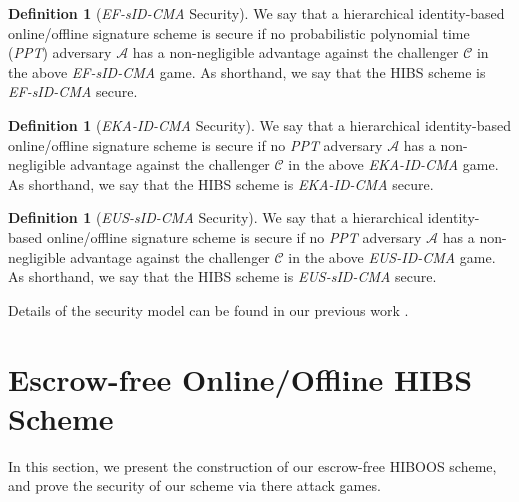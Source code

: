 \documentclass[times]{secauth}
\theoremstyle{definition}
\newtheorem{definition}[theorem]{Definition}
\theoremstyle{remark}
\begin{document}
\begin{definition}[\emph{EF-sID-CMA} Security]
We say that a hierarchical identity-based online/offline signature scheme is secure if no probabilistic polynomial time (\emph{PPT}) adversary $\mathcal{A}$ has a non-negligible advantage against the challenger $\mathcal{C}$ in the above \emph{EF-sID-CMA} game. 
As shorthand, we say that the HIBS scheme is \emph{EF-sID-CMA} secure.
\end{definition}
\par
\begin{definition}[\emph{EKA-ID-CMA} Security]
We say that a hierarchical identity-based online/offline signature scheme is secure if no \emph{PPT} adversary $\mathcal{A}$ has a non-negligible advantage against the challenger $\mathcal{C}$ in the above \emph{EKA-ID-CMA} game. 
As shorthand, we say that the HIBS scheme is \emph{EKA-ID-CMA} secure.
\end{definition}
\begin{definition}[\emph{EUS-sID-CMA} Security]
We say that a hierarchical identity-based online/offline signature scheme is secure if no \emph{PPT} adversary $\mathcal{A}$ has a non-negligible advantage against the challenger $\mathcal{C}$ in the above \emph{EUS-ID-CMA} game. 
As shorthand, we say that the HIBS scheme is \emph{EUS-sID-CMA} secure.
\end{definition}
\par
Details of the security model can be found in our previous work \cite{anescrowfree2015chen}.

\section{Escrow-free Online/Offline HIBS Scheme}\label{sec-EFOOHIBS}
In this section, we present the construction of our escrow-free HIBOOS scheme, and prove the security of our scheme via there attack games.
\end{document}
